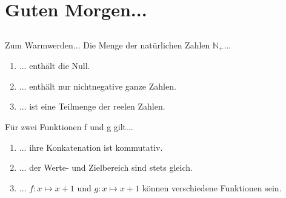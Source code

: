 \section[Einstieg]{Guten Morgen...}
\subsection*{}
\begin{frame}{Zum Warmwerden...}
  Die Menge der natürlichen Zahlen $\mathbb{N_+}$...
    \begin{enumerate}
    \item { 
    ... enthält die Null.
    }
    \item { 
    ... enthält nur nichtnegative ganze Zahlen.
    }
    \item { 
    ... ist eine Teilmenge der reelen Zahlen.
    }
    \end{enumerate}

  Für zwei Funktionen f und g gilt...
    \begin{enumerate}
    \item { 
    ... ihre Konkatenation ist kommutativ.
    }
    \item { 
    ... der Werte- und Zielbereich sind stets gleich.
    }
    \item { 
    ... $f: x\mapsto x+1$ und $g: x \mapsto x+1$ können verschiedene Funktionen sein.
    }
    \end{enumerate}

\end{frame}
